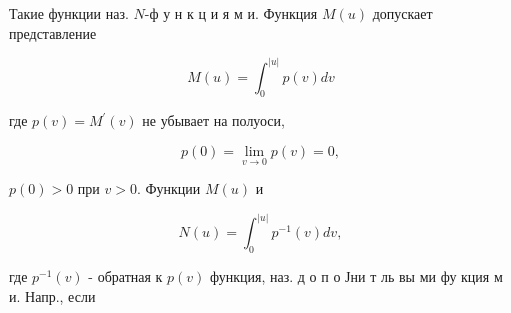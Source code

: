 \documentclass[10pt]{article}
\begin{document}
Такие функции наз. $N$-ф у н к ц и я м и. Функция $M(u)$ допускает представление



\[

M(u)=\int_{0}^{|u|} p(v) d v

\]



где $p(v)=M^{\prime}(v)$ не убывает на полуоси,



\[

p(0)=\lim _{v \rightarrow 0} p(v)=0,

\]



$p(0)>0$ при $v>0$. Функции $M(u)$ и



\[

N(u)=\int_{0}^{|u|} p^{-1}(v) d v,

\]



где $p^{-1}(v)$ - обратная к $p(v)$ функция, наз. д о п о Јни т ль вы ми фу кция м и. Напр., если
\end{document}
